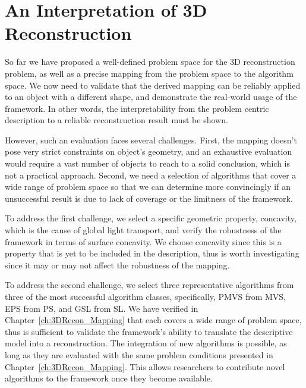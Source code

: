 
\chapter{An Interpretation of 3D Reconstruction}
\label{ch:3DRecon_Interp}
So far we have proposed a well-defined problem space for the 3D reconstruction problem, as well as a precise mapping from the problem space to the algorithm space. We now need to validate that the derived mapping can be reliably applied to an object with a different shape, and demonstrate the real-world usage of the framework. In other words, the interpretability from the problem centric description to a reliable reconstruction result must be shown.

However, such an evaluation faces several challenges. First, the mapping doesn't pose very strict constraints on object's geometry, and an exhaustive evaluation would require a vast number of objects to reach to a solid conclusion, which is not a practical approach. Second, we need a selection of algorithms that cover a wide range of problem space so that we can determine more convincingly if an unsuccessful result is due to lack of coverage or the limitness of the framework.

To address the first challenge, we select a specific geometric property, concavity, which is the cause of global light transport, and verify the robustness of the framework in terms of surface concavity. We choose concavity since this is a property that is yet to be included in the description, thus is worth investigating since it may or may not affect the robustness of the mapping.

To address the second challenge, we select three representative algorithms from three of the most successful algorithm classes, specifically, PMVS from MVS, EPS from PS, and GSL from SL. We have verified in Chapter~\ref{ch:3DRecon_Mapping} that each covers a wide range of problem space, thus is sufficient to validate the framework's ability to translate the descriptive model into a reconstruction. The integration of new algorithms is possible, as long as they are evaluated with the same problem conditions presented in Chapter~\ref{ch:3DRecon_Mapping}. This allows researchers to contribute novel algorithms to the framework once they become available.


